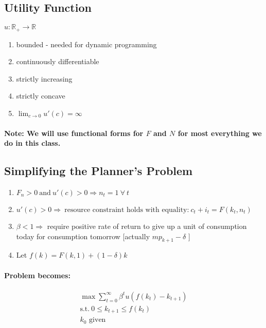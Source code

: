 \documentclass{article}
\begin{document}
\subsection{Utility Function}
$u : \mathbb{R}_+ \rightarrow \mathbb{R}$
\begin{enumerate}
    \item bounded - needed for dynamic programming
    \item continuously differentiable
    \item strictly increasing
    \item strictly concave
    \item $\lim_{c \to 0} u'(c) = \infty$
\end{enumerate}

\paragraph{Note: We will use functional forms for $F$ and $N$ for most everything we do in this class.}

\subsection{Simplifying the Planner's Problem}
\begin{enumerate}
    \item $F_n > 0\ \text{and}\ u'(c) > 0 \Rightarrow n_t = 1\ \forall \ t$
    \item $ u'(c) > 0 \Rightarrow \ \text{resource constraint holds with equality:}\ c_t + i_t = F(k_t,n_t)$
    \item $ \beta < 1 \Rightarrow$ require positive rate of return to give up a unit of consumption today for 
    consumption tomorrow [actually  $mp_{k+1}-\delta$ ]
    \item Let $f(k) = F(k,1) + (1-\delta)k$
\end{enumerate}

\paragraph{Problem becomes:}
\[
    \begin{aligned}
        \max_{} \sum_{t=0}^\infty \beta^t u(f(k_t) - k_{t+1})\\
        \text{s.t.}\ 
        0 \leq k_{t+1} \leq f(k_t)\\
        k_0 \text{ given}
    \end{aligned}
\]
\end{document}
